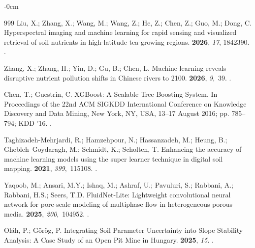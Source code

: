 \documentclass[environremediat,article,accept,pdftex,oneauthor]{Definitions/mdpi}
\begin{document}
\begin{adjustwidth}{-\extralength}{0cm}
\begin{thebibliography}{999}
Liu, X.; Zhang, X.; Wang, M.; Wang, Z.; He, Z.; Chen, Z.; Guo, M.; Dong, C.
\newblock Hyperspectral imaging and machine learning for rapid sensing and
  visualized retrieval of soil nutrients in high-latitude tea-growing regions.
 {\bf 2026}, {\em 17}, 1842390.
.

Zhang, X.; Zhang, H.; Yin, D.; Gu, B.; Chen, L.
\newblock Machine learning reveals disruptive nutrient pollution shifts in
  Chinese rivers to 2100.
 {\bf 2026}, {\em 9},~39.
.

Chen, T.; Guestrin, C.
\newblock XGBoost: A Scalable Tree Boosting System.
\newblock In Proceedings of the 22nd ACM SIGKDD
  International Conference on Knowledge Discovery and Data Mining, New York,
  NY, USA, 13--17 August %
 2016;  pp. 785--794; KDD '16. %
.

Taghizadeh-Mehrjardi, R.; Hamzehpour, N.; Hassanzadeh, M.; Heung, B.;
  Ghebleh~Goydaragh, M.; Schmidt, K.; Scholten, T.
\newblock Enhancing the accuracy of machine learning models using the super
  learner technique in digital soil mapping.
 {\bf 2021}, {\em 399},~115108.
.

Yaqoob, M.; Ansari, M.Y.; Ishaq, M.; Ashraf, U.; Pavuluri, S.; Rabbani, A.;
  Rabbani, H.S.; Seers, T.D.
\newblock FluidNet-Lite: Lightweight convolutional neural network for
  pore-scale modeling of multiphase flow in heterogeneous porous media.
 {\bf 2025}, {\em 200},~104952.
.

Ol{\'a}h, P.; G{\"o}r{\"o}g, P.
\newblock Integrating Soil Parameter Uncertainty into Slope Stability Analysis:
  A Case Study of an Open Pit Mine in Hungary.
 {\bf 2025}, {\em 15}.
.


\end{thebibliography}
\end{adjustwidth}
\end{document}
